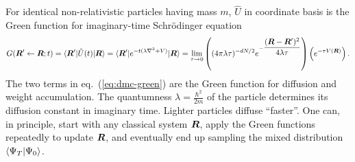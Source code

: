 For identical non-relativistic particles having mass $m$, $\hat{U}$ in coordinate basis is the Green function for imaginary-time Schr\"odinger equation
\begin{align}
G(\boldsymbol{R}'\leftarrow\boldsymbol{R};t) = \braket{\boldsymbol{R}'|\hat{U}(t)|\boldsymbol{R}} =  \braket{\boldsymbol{R}'|e^{-t(\lambda \nabla^2+V)}|\boldsymbol{R}} = \lim\limits_{\tau\rightarrow 0}
\left(
(4\pi\lambda\tau)^{-dN/2}e^{-\dfrac{(\boldsymbol{R}-\boldsymbol{R}')^2}{4\lambda\tau}}
\right)
\left(
e^{-\tau V(\boldsymbol{R})}
\right). \label{eq:dmc-green}
\end{align}
The two terms in eq.~(\ref{eq:dmc-green}) are the Green function for diffusion and weight accumulation.
The quantumness $\lambda=\frac{\hbar^2}{2m}$ of the particle determines its diffusion constant in imaginary time. Lighter particles diffuse ``faster''. One can, in principle, start with any classical system $\boldsymbol{R}$, apply the Green functions repeatedly to update $\boldsymbol{R}$, and eventually end up sampling the mixed distribution $\braket{\Psi_T|\Psi_0}$.

